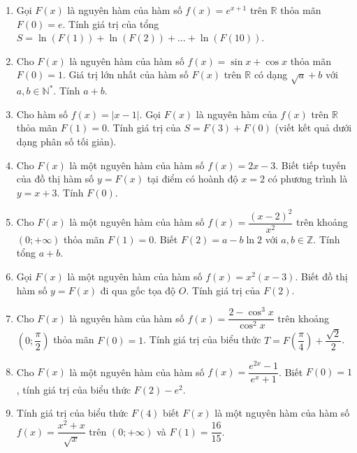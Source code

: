 \documentclass[12pt]{article}
\begin{document}
\begin{enumerate}[label=\textbf{Câu \arabic*.}, start=1]
		
		\item Gọi $F(x)$ là nguyên hàm của hàm số $f(x) = e^{x+1}$ trên $\mathbb{R}$ thỏa mãn $F(0) = e$. Tính giá trị của tổng $S = \ln(F(1)) + \ln(F(2)) + \dots + \ln(F(10))$.
		
		
		\item Cho $F(x)$ là nguyên hàm của hàm số $f(x) = \sin x + \cos x$ thỏa mãn $F(0) = 1$. Giá trị lớn nhất của hàm số $F(x)$ trên $\mathbb{R}$ có dạng $\sqrt{a} + b$ với $a, b \in \mathbb{N}^*$. Tính $a + b$.
		
		
		\item Cho hàm số $f(x) = |x - 1|$. Gọi $F(x)$ là nguyên hàm của $f(x)$ trên $\mathbb{R}$ thỏa mãn $F(1) = 0$. Tính giá trị của $S = F(3) + F(0)$ (viết kết quả dưới dạng phân số tối giản).
		
		
		\item Cho $F(x)$ là một nguyên hàm của hàm số $f(x) = 2x - 3$. Biết tiếp tuyến của đồ thị hàm số $y = F(x)$ tại điểm có hoành độ $x = 2$ có phương trình là $y = x + 3$. Tính $F(0)$.
		
		\item Cho $F(x)$ là một nguyên hàm của hàm số $f(x) = \dfrac{(x-2)^2}{x^2}$ trên khoảng $(0; +\infty)$ thỏa mãn $F(1) = 0$. Biết $F(2) = a - b\ln 2$ với $a, b \in \mathbb{Z}$. Tính tổng $a + b$.
		
		
		\item Gọi $F(x)$ là một nguyên hàm của hàm số $f(x) = x^2(x - 3)$. Biết đồ thị hàm số $y = F(x)$ đi qua gốc tọa độ $O$. Tính giá trị của $F(2)$.
		
		
		\item Cho $F(x)$ là nguyên hàm của hàm số $f(x) = \dfrac{2 - \cos^3 x}{\cos^2 x}$ trên khoảng $\left(0; \dfrac{\pi}{2}\right)$ thỏa mãn $F(0) = 1$. Tính giá trị của biểu thức $T = F\left(\dfrac{\pi}{4}\right) + \dfrac{\sqrt{2}}{2}$.
		
		
		\item Cho $F(x)$ là một nguyên hàm của hàm số $f(x) = \dfrac{e^{2x} - 1}{e^x + 1}$. Biết $F(0) = 1$, tính giá trị của biểu thức $F(2) - e^2$.
		
		
		\item Tính giá trị của biểu thức $F(4)$ biết $F(x)$ là một nguyên hàm của hàm số $f(x) = \dfrac{x^2 + x}{\sqrt{x}}$ trên $(0; +\infty)$ và $F(1) = \dfrac{16}{15}$.
		

\end{enumerate}
\end{document}

